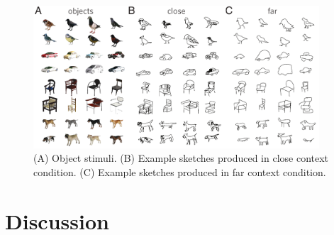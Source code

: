 \documentclass[9pt,twocolumn,twoside]{pnas-new}
\newcommand{\ndg}[1]{\textcolor{Green}{[ndg: #1]}}
\begin{document}


\begin{figure}[htbp]
\centering
\includegraphics[width=0.95\textwidth]{figures/2_sketch_gallery-min.pdf}
\caption{(A) Object stimuli. (B) Example sketches produced in close context condition. (C) Example sketches produced in far context condition.}
\label{sketch_gallery}
\end{figure}


\section*{Discussion}
\end{document}
